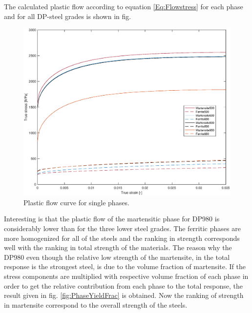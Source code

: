 \documentclass{article}
\begin{document}
The calculated plastic flow according to equation \ref{Eq:Flowstress} for each phase and for all DP-steel grades is shown in fig. 

\begin{figure}[h!]
    \centering
    \includegraphics[width=\linewidth]{PhaseYield.eps}
    \caption{Plastic flow curve for single phases.}
    \label{fig:PhaseYield}
\end{figure}

Interesting is that the plastic flow of the martensitic phase for DP980 is considerably lower than for the three lower steel grades. The ferritic phases are more homogenized for all of the steels and the ranking in strength corresponds well with the ranking in total strength of the materials. The reason why the DP980 even though the relative low strength of the martensite, in the total response is the strongest steel, is due to the volume fraction of martensite. If the stress components are multiplied with respective volume fraction of each phase in order to get the relative contribution from each phase to the total response, the result given in fig. \ref{fig:PhaseYieldFrac} is obtained. Now the ranking of strength in martensite correspond to the overall strength of the steels.
\end{document}

